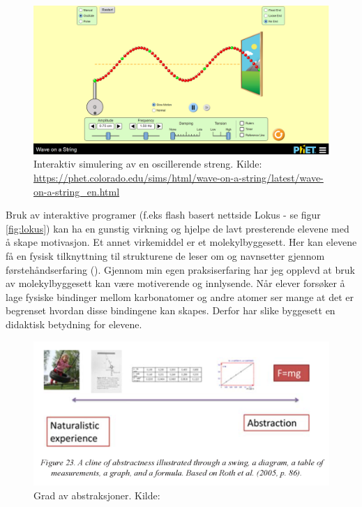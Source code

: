 \documentclass[main.tex]{subfiles}
\begin{document}
\begin{figure}[h!]
\centering
\includegraphics[scale = 0.25]{../figures/wave.png}
\caption{Interaktiv simulering av en oscillerende streng. Kilde: 
\protect\url{https://phet.colorado.edu/sims/html/wave-on-a-string/latest/wave-on-a-string_en.html}}
\label{fig:wave}
\end{figure}

\hspace{-6mm}Bruk av interaktive programer (f.eks flash basert nettside Lokus - se figur \ref{fig:lokus}) kan ha en gunstig virkning og hjelpe de lavt presterende elevene med å skape motivasjon. Et annet virkemiddel er et molekylbyggesett. Her kan elevene få en fysisk tilknyttning til strukturene de leser om og navnsetter gjennom førstehåndserfaring (). Gjennom min egen praksiserfaring har jeg opplevd at bruk av molekylbyggesett kan være motiverende og innlysende. Når elever forsøker å lage fysiske bindinger mellom karbonatomer og andre atomer ser mange at det er begrenset hvordan disse bindingene kan skapes. Derfor har slike byggesett en didaktisk betydning for elevene. \newline

\begin{figure}[h!]
\centering
\includegraphics[scale = 0.6]{../figures/knain.png}
\caption{Grad av abstraksjoner. Kilde: \protect{}}
\label{fig:knain}
\end{figure}
\end{document}
